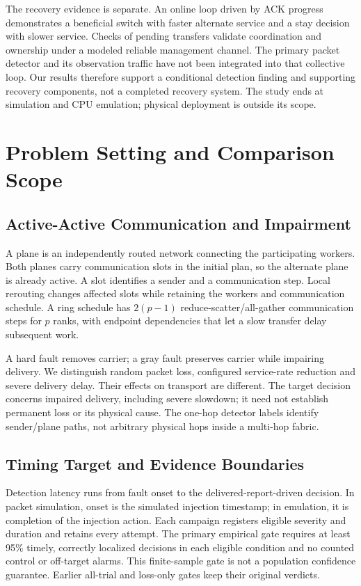 \documentclass[sigconf]{acmart}
\begin{document}
The recovery evidence is separate. An online loop driven by ACK progress
demonstrates a beneficial switch with faster alternate service and a stay
decision with slower service. Checks of pending transfers validate
coordination and ownership under a modeled reliable management channel.
The primary packet detector and its observation traffic have not been
integrated into that collective loop. Our results therefore support a
conditional detection finding and supporting recovery components, not a
completed recovery system. The study ends at simulation and
CPU emulation; physical deployment is outside its scope.

\section{Problem Setting and Comparison Scope}
\label{sec:setting}
\subsection{Active-Active Communication and Impairment}
A plane is an independently routed network connecting the participating
workers. Both planes carry communication slots in the initial plan, so the
alternate plane is already active. A slot identifies a sender and a
communication step. Local rerouting changes affected slots while retaining
the workers and communication schedule. A ring schedule has $2(p-1)$
reduce-scatter/all-gather communication steps for $p$ ranks, with endpoint
dependencies that let a slow transfer delay subsequent work.

A hard fault removes carrier; a gray fault preserves carrier while
impairing delivery. We distinguish random packet loss, configured service-rate
reduction and severe delivery delay. Their effects on transport are different.
The target decision concerns impaired delivery, including severe slowdown;
it need not establish permanent loss or its physical cause. The one-hop
detector labels identify sender/plane paths, not arbitrary physical hops
inside a multi-hop fabric.

\subsection{Timing Target and Evidence Boundaries}
Detection latency runs from fault onset to the delivered-report-driven
decision. In packet simulation, onset is the simulated injection timestamp;
in emulation, it is completion of the injection action. Each campaign
registers eligible severity and duration and retains every attempt. The
primary empirical gate requires at least 95\% timely, correctly localized
decisions in each eligible condition and no counted control or off-target
alarms. This finite-sample gate is not a population confidence guarantee.
Earlier all-trial and loss-only gates keep their original verdicts.
\end{document}
